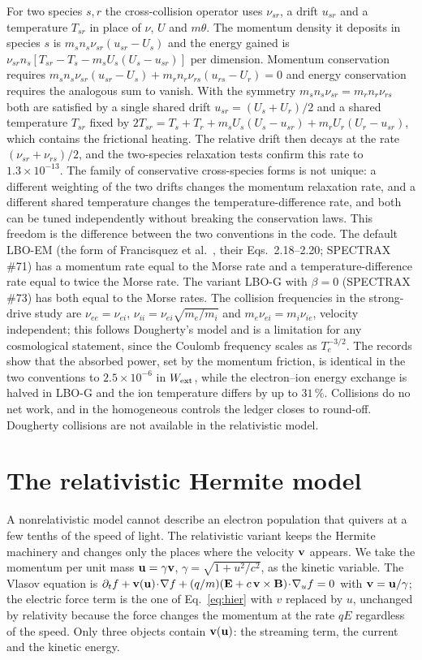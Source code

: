 For two species $s,r$ the cross-collision operator uses $\nu_{sr}$, a drift $u_{sr}$ and a temperature $T_{sr}$ in place of $\nu$, $U$ and $m\theta$. The momentum density it deposits in species $s$ is $m_sn_s\nu_{sr}(u_{sr}-U_s)$ and the energy gained is $\nu_{sr}n_s[T_{sr}-T_s-m_sU_s(U_s-u_{sr})]$ per dimension. Momentum conservation requires $m_sn_s\nu_{sr}(u_{sr}-U_s)+m_rn_r\nu_{rs}(u_{rs}-U_r)=0$ and energy conservation requires the analogous sum to vanish. With the symmetry $m_sn_s\nu_{sr}=m_rn_r\nu_{rs}$ both are satisfied by a single shared drift $u_{sr}=(U_s+U_r)/2$ and a shared temperature $T_{sr}$ fixed by $2T_{sr}=T_s+T_r+m_sU_s(U_s-u_{sr})+m_rU_r(U_r-u_{sr})$, which contains the frictional heating. The relative drift then decays at the rate $(\nu_{sr}+\nu_{rs})/2$, and the two-species relaxation tests confirm this rate to $1.3\times10^{-13}$. The family of conservative cross-species forms is not unique: a different weighting of the two drifts changes the momentum relaxation rate, and a different shared temperature changes the temperature-difference rate, and both can be tuned independently without breaking the conservation laws. This freedom is the difference between the two conventions in the code. The default LBO-EM (the form of Francisquez et al.~\cite{Francisquez2022}, their Eqs.~2.18--2.20; SPECTRAX \#71) has a momentum rate equal to the Morse rate and a temperature-difference rate equal to twice the Morse rate. The variant LBO-G with $\beta=0$ (SPECTRAX \#73) has both equal to the Morse rates. The collision frequencies in the strong-drive study are $\nu_{ee}=\nu_{ei}$, $\nu_{ii}=\nu_{ei}\sqrt{m_e/m_i}$ and $m_e\nu_{ei}=m_i\nu_{ie}$, velocity independent; this follows Dougherty's model and is a limitation for any cosmological statement, since the Coulomb frequency scales as $T_e^{-3/2}$. The records show that the absorbed power, set by the momentum friction, is identical in the two conventions to $2.5\times10^{-6}$ in $W_{\rm ext}$, while the electron--ion energy exchange is halved in LBO-G and the ion temperature differs by up to $31\,\%$. Collisions do no net work, and in the homogeneous controls the ledger closes to round-off. Dougherty collisions are not available in the relativistic model.

\section{The relativistic Hermite model}\label{sec:relativistic}

A nonrelativistic model cannot describe an electron population that quivers at a few tenths of the speed of light. The relativistic variant keeps the Hermite machinery and changes only the places where the velocity $\mathbf{v}$ appears. We take the momentum per unit mass $\mathbf u=\gamma\mathbf{v}$, $\gamma=\sqrt{1+u^2/c^2}$, as the kinetic variable. The Vlasov equation is $\partial_tf+\mathbf{v}(\mathbf u)\!\cdot\!\nabla f+(q/m)(\mathbf{E}+c\,\mathbf{v}\times\mathbf{B})\!\cdot\!\nabla_uf=0$ with $\mathbf{v}=\mathbf u/\gamma$; the electric force term is the one of Eq.~\eqref{eq:hier} with $v$ replaced by $u$, unchanged by relativity because the force changes the momentum at the rate $qE$ regardless of the speed. Only three objects contain $\mathbf{v}(\mathbf u)$: the streaming term, the current and the kinetic energy.

